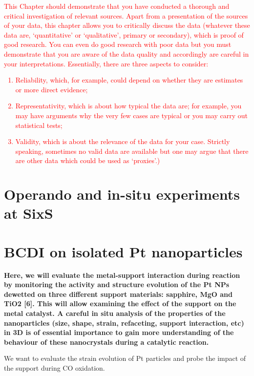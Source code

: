 \textcolor{red}{This Chapter should demonstrate that you have conducted a thorough and critical investigation of relevant sources.
Apart from a presentation of the sources of your data, this chapter allows you to critically discuss the data (whatever these data are, ‘quantitative’ or ‘qualitative’, primary or secondary), which is proof of good research. You can even do good research with poor data but you must demonstrate that you are aware of the data quality and accordingly are careful in your interpretations. Essentially, there are three aspects to consider:
\begin{enumerate}
\item	Reliability, which, for example, could depend on whether they are estimates or more direct evidence;
\item	Representativity, which is about how typical the data are; for example, you may have arguments why the very few cases are typical or you may carry out statistical tests;
\item Validity, which is about the relevance of the data for your case. Strictly speaking, sometimes no valid data are available but one may argue that there are other data which could be used as ‘proxies’.) 
\end{enumerate}
}

\section{Operando and in-situ experiments at SixS}



\section{BCDI on isolated Pt nanoparticles}

\textbf{Here, we will evaluate the metal-support interaction during reaction by monitoring the activity and structure evolution of the Pt NPs dewetted on three different support materials: sapphire, MgO and TiO2 [6]. This will allow examining the effect of the support on the metal catalyst. A careful in situ analysis of the properties of the nanoparticles (size, shape, strain, refaceting, support interaction, etc) in 3D is of essential importance to gain more understanding of the behaviour of these nanocrystals during a catalytic reaction.}

We want to evaluate the strain evolution of Pt particles and probe the impact of the support during CO oxidation.

